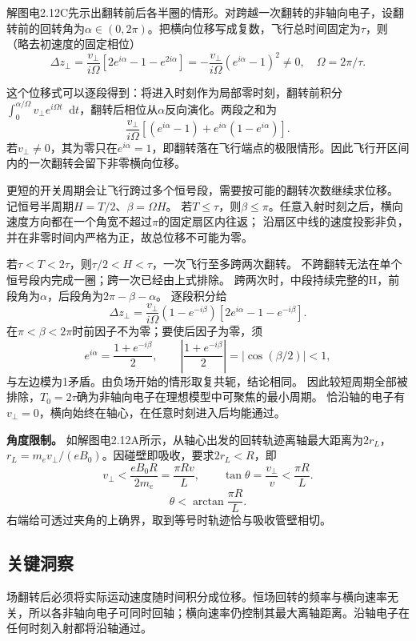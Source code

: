 \documentclass[UTF8,fontset=fandol,a4paper,11pt]{ctexart}
\newcommand{\dd}{\mathop{}\!\mathrm{d}}
\newcommand{\result}[1]{\begin{equation*}\boxed{#1}\end{equation*}}
\begin{document}
解图电2.12C先示出翻转前后各半圈的情形。对跨越一次翻转的非轴向电子，设翻转前的回转角为$\alpha\in(0,2\pi)$。把横向位移写成复数，飞行总时间固定为$\tau$，则（略去初速度的固定相位）
\[
 \Delta z_\perp=\frac{v_\perp}{i\Omega}
 [2e^{i\alpha}-1-e^{2i\alpha}]
 =-\frac{v_\perp}{i\Omega}(e^{i\alpha}-1)^2\ne0,
 \quad\Omega=2\pi/\tau.
\]

这个位移式可以逐段得到：将进入时刻作为局部零时刻，翻转前积分$\int_0^{\alpha/\Omega}v_\perp e^{i\Omega t}\dd t$，翻转后相位从$\alpha$反向演化。两段之和为
\[
\frac{v_\perp}{i\Omega}
\left[(e^{i\alpha}-1)+e^{i\alpha}(1-e^{i\alpha})\right].
\]
若$v_\perp\ne0$，其为零只在$e^{i\alpha}=1$，即翻转落在飞行端点的极限情形。因此飞行开区间内的一次翻转会留下非零横向位移。

更短的开关周期会让飞行跨过多个恒号段，需要按可能的翻转次数继续求位移。
记恒号半周期$H=T/2$、$\beta=\Omega H$。
若$T\le\tau$，则$\beta\le\pi$。任意入射时刻之后，横向速度方向都在一个角宽不超过$\pi$的固定扇区内往返；
沿扇区中线的速度投影非负，并在非零时间内严格为正，故总位移不可能为零。

若$\tau<T<2\tau$，则$\tau/2<H<\tau$，一次飞行至多跨两次翻转。
不跨翻转无法在单个恒号段内完成一圈；跨一次已经由上式排除。
跨两次时，中段持续完整的H，前段角为$\alpha$，后段角为$2\pi-\beta-\alpha$。
逐段积分给
\[
\Delta z_\perp=\frac{v_\perp}{i\Omega}
(1-e^{-i\beta})[2e^{i\alpha}-1-e^{-i\beta}].
\]
在$\pi<\beta<2\pi$时前因子不为零；要使后因子为零，须
\[
e^{i\alpha}=\frac{1+e^{-i\beta}}2,\qquad
\left|\frac{1+e^{-i\beta}}2\right|=|\cos(\beta/2)|<1,
\]
与左边模为1矛盾。由负场开始的情形取复共轭，结论相同。
因此较短周期全部被排除，$T_0=2\tau$确为非轴向电子在理想模型中可聚焦的最小周期。
恰沿轴的电子有 $v_\perp=0$，横向始终在轴心，在任意时刻进入后均能通过。

\textbf{角度限制。} 如解图电2.12A所示，从轴心出发的回转轨迹离轴最大距离为$2r_L$，$r_L=m_ev_\perp/(eB_0)$。因碰壁即吸收，要求$2r_L<R$，即
\[
 v_\perp<\frac{eB_0R}{2m_e}=\frac{\pi Rv}{L},\qquad
 \tan\theta=\frac{v_\perp}{v}<\frac{\pi R}{L}.
\]
\result{\theta<\arctan\frac{\pi R}{L}.}
右端给可透过夹角的上确界，取到等号时轨迹恰与吸收管壁相切。



\subsection*{关键洞察}

场翻转后必须将实际运动速度随时间积分成位移。恒场回转的频率与横向速率无关，所以各非轴向电子可同时回轴；横向速率仍控制其最大离轴距离。沿轴电子在任何时刻入射都将沿轴通过。
\end{document}
